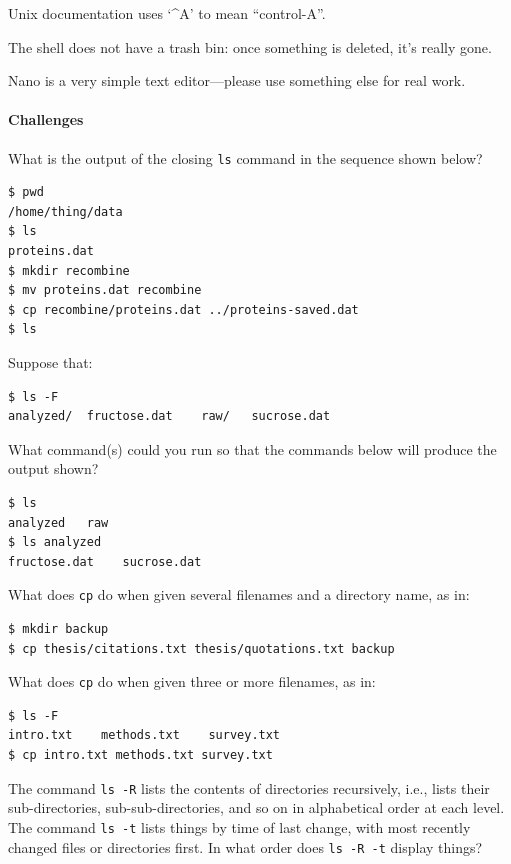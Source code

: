 \documentclass{book}
\begin{document}
\begin{keypoints}
\begin{swcitemize}
\item
  Unix documentation uses `\^{}A' to mean ``control-A''.
\item
  The shell does not have a trash bin: once something is deleted, it's
  really gone.
\item
  Nano is a very simple text editor---please use something else for real
  work.
\end{swcitemize}
\end{keypoints}

\mbox{}\paragraph{Challenges}

\begin{swcenumerate}
\item
  What is the output of the closing \texttt{ls} command in the sequence
  shown below?

\begin{verbatim}
$ pwd
/home/thing/data
$ ls
proteins.dat
$ mkdir recombine
$ mv proteins.dat recombine
$ cp recombine/proteins.dat ../proteins-saved.dat
$ ls
\end{verbatim}
\item
  Suppose that:

\begin{verbatim}
$ ls -F
analyzed/  fructose.dat    raw/   sucrose.dat
\end{verbatim}

  What command(s) could you run so that the commands below will produce
  the output shown?

\begin{verbatim}
$ ls
analyzed   raw
$ ls analyzed
fructose.dat    sucrose.dat
\end{verbatim}
\item
  What does \texttt{cp} do when given several filenames and a directory
  name, as in:

\begin{verbatim}
$ mkdir backup
$ cp thesis/citations.txt thesis/quotations.txt backup
\end{verbatim}

  What does \texttt{cp} do when given three or more filenames, as in:

\begin{verbatim}
$ ls -F
intro.txt    methods.txt    survey.txt
$ cp intro.txt methods.txt survey.txt
\end{verbatim}
\item
  The command \texttt{ls -R} lists the contents of directories
  recursively, i.e., lists their sub-directories, sub-sub-directories,
  and so on in alphabetical order at each level. The command
  \texttt{ls -t} lists things by time of last change, with most recently
  changed files or directories first. In what order does
  \texttt{ls -R -t} display things?
\end{swcenumerate}
\end{document}
